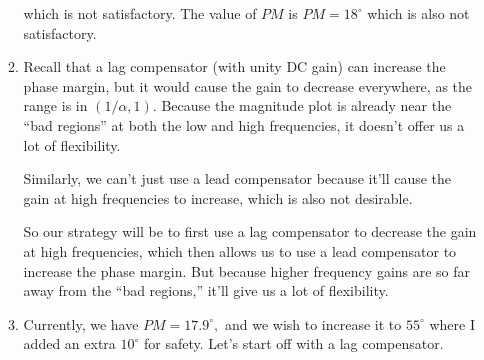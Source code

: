 \documentclass{article}
\begin{document}
\begin{enumerate}[label=\textbf{4.\arabic*}]
\begin{enumerate}[label=(\alph*)]
\begin{center}
    \end{center}
    which is not satisfactory. The value of $PM$ is $PM=18^\circ$ which is also not satisfactory. 

    \item Recall that a lag compensator (with unity DC gain) can increase the phase margin, but it would cause the gain to decrease everywhere, as the range is in $(1/\alpha, 1).$ Because the magnitude plot is already near the ``bad regions'' at both the low and high frequencies, it doesn't offer us a lot of flexibility.
    
    Similarly, we can't just use a lead compensator because it'll cause the gain at high frequencies to increase, which is also not desirable.

    So our strategy will be to first use a lag compensator to decrease the gain at high frequencies, which then allows us to use a lead compensator to increase the phase margin. But because higher frequency gains are so far away from the ``bad regions,'' it'll give us a lot of flexibility.
    
    \item Currently, we have $PM=17.9^\circ,$ and we wish to increase it to $55^\circ$ where I added an extra $10^\circ$ for safety. Let's start off with a lag compensator.
    

\end{enumerate}
\end{enumerate}
\end{document}
